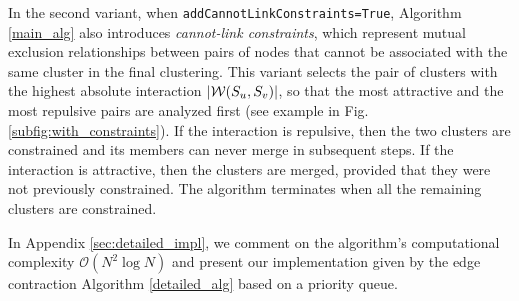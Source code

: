 In the second variant, when \texttt{addCannotLinkConstraints=True}, Algorithm \ref{main_alg} also introduces \emph{cannot-link constraints}, which represent mutual exclusion relationships between pairs of nodes that cannot be associated with the same cluster in the final clustering. This variant 
selects the pair of clusters with the highest absolute interaction $|\mathcal{W}(S_u, S_v)|$, so that the most attractive and the most repulsive pairs are analyzed first (see example in Fig. \ref{subfig:with_constraints}). If the interaction is repulsive, then the two clusters are constrained and its members can never merge in subsequent steps. If the interaction is attractive, then the clusters are merged, provided that they were not previously constrained. 
The algorithm terminates when all the remaining clusters are constrained.

In Appendix \ref{sec:detailed_impl}, we comment on the algorithm's computational complexity $\mathcal{O}(N^2 \log N)$ and present our implementation given by the edge contraction Algorithm \ref{detailed_alg} based on a priority queue.

